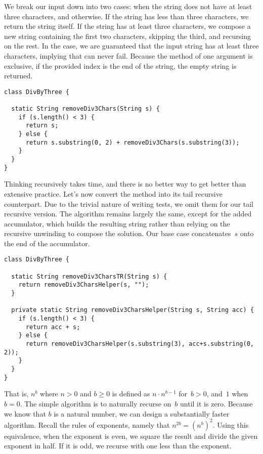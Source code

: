 We break our input down into two cases: when the string does not have at least three characters, and otherwise. 
If the string has less than three characters, we return the string itself. 
If the string has at least three characters, we compose a new string containing the first two characters, skipping the third, and recursing on the rest. 
In the  case, we are guaranteed that the input string has at least three characters, implying that  can never fail. 
Because the  method of one argument is exclusive, if the provided index is the end of the string, the empty string is returned.

\begin{lstlisting}[language=MyJava]
class DivByThree {

  static String removeDiv3Chars(String s) {
    if (s.length() < 3) {
      return s;
    } else {
      return s.substring(0, 2) + removeDiv3Chars(s.substring(3));
    }
  }
}
\end{lstlisting}

Thinking recursively takes time, and there is no better way to get better than extensive practice. Let's now convert the method into its tail recursive counterpart. 
Due to the trivial nature of writing tests, we omit them for our tail recursive version. 
The algorithm remains largely the same, except for the added accumulator, which builds the resulting string rather than relying on the recursive unwinding to compose the solution. 
Our base case concatenates~$s$ onto the end of the accumulator.

\begin{lstlisting}[language=MyJava]
class DivByThree {

  static String removeDiv3CharsTR(String s) {
    return removeDiv3CharsHelper(s, "");
  }

  private static String removeDiv3CharsHelper(String s, String acc) {
    if (s.length() < 3) {
      return acc + s;
    } else {
      return removeDiv3CharsHelper(s.substring(3), acc+s.substring(0, 2));
    }
  }
}
\end{lstlisting}

That is, $n^b$ where $n > 0$ and $b \geq 0$ is defined as $n \cdot n^{b-1}$ for~$b > 0$, and~$1$ when~$b=0$.
The simple algorithm is to naturally recurse on~$b$ until it is zero. 
Because we know that $b$ is a natural number, we can design a substantially faster algorithm.
Recall the rules of exponents, namely that $n^{2b} = (n^b)^2$. 
Using this equivalence, when the exponent is even, we square the result and divide the given exponent in half.
If it is odd, we recurse with one less than the exponent.

